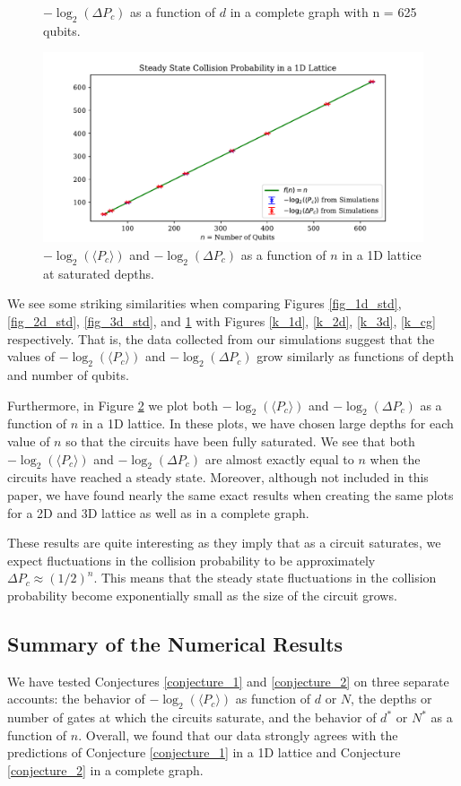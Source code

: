 \documentclass[11pt]{article}
\theoremstyle{definition}
\theoremstyle{plain}
\begin{document}
{\begin{figure}[!htb]
\caption{$-\log_2(\Delta P_c)$ as a function of $d$ in a complete graph with n = 625 qubits.}
\label{fig_cg_std}
\end{figure}
\begin{figure}[!htb]
\centering
\includegraphics[width=.8\textwidth]{figures/1D/steady_state_cp.pdf}
\caption{$-\log_2(\langle P_c \rangle)$ and $-\log_2(\Delta P_c)$ as a function of $n$ in a 1D lattice at saturated depths.}
\label{fig_steady_state}
\end{figure}

We see some striking similarities when comparing Figures {\ref{fig_1d_std}}, {\ref{fig_2d_std}}, {\ref{fig_3d_std}}, and {\ref{fig_cg_std}} with Figures {\ref{k_1d}}, {\ref{k_2d}}, {\ref{k_3d}}, {\ref{k_cg}} respectively. That is, the data collected from our simulations suggest that the values of $-\log_2(\langle P_c \rangle)$ and $-\log_2(\Delta P_c)$ grow similarly as functions of depth and number of qubits.
    
Furthermore, in Figure {\ref{fig_steady_state}} we plot both $-\log_2(\langle P_c \rangle)$ and $-\log_2(\Delta P_c)$ as a function of $n$ in a 1D lattice. In these plots, we have chosen large depths for each value of $n$ so that the circuits have been fully saturated. We see that both $-\log_2(\langle P_c \rangle)$ and $-\log_2(\Delta P_c)$ are almost exactly equal to $n$ when the circuits have reached a steady state. Moreover, although not included in this paper, we have found nearly the same exact results when creating the same plots for a 2D and 3D lattice as well as in a complete graph. 

These results are quite interesting as they imply that as a circuit saturates, we expect fluctuations in the collision probability to be approximately $\Delta P_c \approx {(1/2)}^n$. This means that the steady state fluctuations in the collision probability become exponentially small as the size of the circuit grows. 

\subsection{Summary of the Numerical Results}
We have tested Conjectures {\ref{conjecture_1}} and {\ref{conjecture_2}} on three separate accounts: the behavior of $-\log_2 (\langle P_c \rangle)$ as function of $d$ or $N$, the depths or number of gates at which the circuits saturate, and the behavior of $d^*$ or $N^*$ as a function of $n$. Overall, we found that our data strongly agrees with the predictions of Conjecture {\ref{conjecture_1}} in a 1D lattice and Conjecture {\ref{conjecture_2}} in a complete graph.

}
\end{document}
